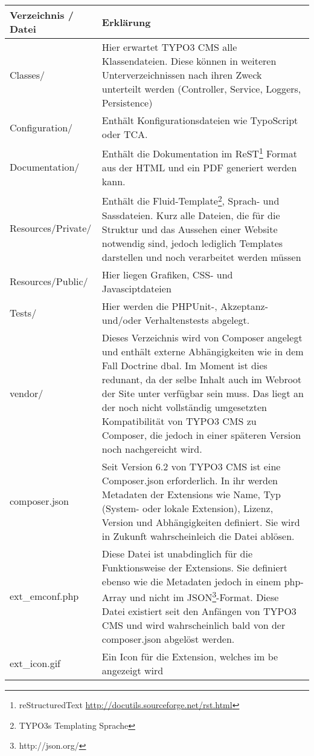 \begin{longtable}{|l|p{}|}
	\hline
	Verzeichnis / Datei & Erklärung \\ \hline
	Classes/ & Hier erwartet TYPO3 CMS alle Klassendateien. Diese können in weiteren Unterverzeichnissen nach ihren Zweck unterteilt werden (Controller, Service, Loggers, Persistence)\\ \hline
	Configuration/ & Enthält Konfigurationsdateien wie TypoScript oder TCA.\\ \hline
	Documentation/ & Enthält die Dokumentation im ReST\footnote{reStructuredText \url{http://docutils.sourceforge.net/rst.html}} Format aus der HTML und ein PDF generiert werden kann.\\ \hline
	Resources/Private/ & Enthält die Fluid-Template\footnote{TYPO3s Templating Sprache}, Sprach- und Sassdateien. Kurz alle Dateien, die für die Struktur und das Aussehen einer Website notwendig sind, jedoch lediglich Templates darstellen und noch verarbeitet werden müssen\\ \hline
	Resources/Public/ & Hier liegen Grafiken, CSS- und Javasciptdateien\\ \hline
	Tests/ & Hier werden die PHPUnit-, Akzeptanz- und/oder Verhaltenstests abgelegt.\\ \hline
	vendor/ & Dieses Verzeichnis wird von Composer angelegt und enthält externe Abhängigkeiten wie in dem Fall Doctrine \gls{dbal}. Im Moment ist dies redunant, da der selbe Inhalt auch im Webroot der Site unter \pdf{Packages/Libraries/} verfügbar sein muss. Das liegt an der noch nicht vollständig umgesetzten Kompatibilität von TYPO3 CMS zu Composer, die jedoch in einer späteren Version noch nachgereicht wird.\\ \hline
	composer.json & Seit Version 6.2 von TYPO3 CMS ist eine Composer.json erforderlich. In ihr werden Metadaten der Extensions wie Name, Typ (System- oder lokale Extension), Lizenz, Version und Abhängigkeiten definiert. Sie wird in Zukunft wahrscheinleich die Datei \pdf{ext\_emconf.php} ablösen.\\  \hline
	ext\_emconf.php & Diese Datei ist unabdinglich für die Funktionsweise der Extensions. Sie definiert ebenso wie die \pdf{composer.json} Metadaten jedoch in einem \gls{php}-Array und nicht im JSON\footnote{http://json.org/}-Format. Diese Datei existiert seit den Anfängen von TYPO3 CMS und wird wahrscheinlich bald von der composer.json abgelöst werden.\\ \hline
	ext\_icon.gif & Ein Icon für die Extension, welches im \gls{be} angezeigt wird\\ \hline

\end{longtable}
